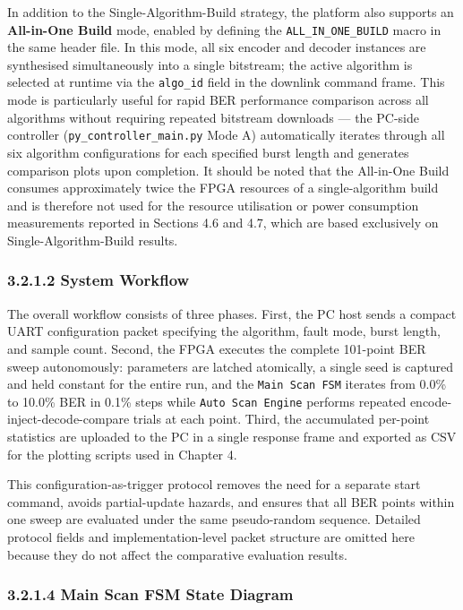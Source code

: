 \documentclass[
  12pt,
  a4paper]{report}
\begin{document}
In addition to the Single-Algorithm-Build strategy, the platform also
supports an \textbf{All-in-One Build} mode, enabled by defining the
\texttt{ALL\_IN\_ONE\_BUILD} macro in the same header file. In this
mode, all six encoder and decoder instances are synthesised
simultaneously into a single bitstream; the active algorithm is selected
at runtime via the \texttt{algo\_id} field in the downlink command
frame. This mode is particularly useful for rapid BER performance
comparison across all algorithms without requiring repeated bitstream
downloads --- the PC-side controller (\texttt{py\_controller\_main.py}
Mode A) automatically iterates through all six algorithm configurations
for each specified burst length and generates comparison plots upon
completion. It should be noted that the All-in-One Build consumes
approximately twice the FPGA resources of a single-algorithm build and
is therefore not used for the resource utilisation or power consumption
measurements reported in Sections 4.6 and 4.7, which are based
exclusively on Single-Algorithm-Build results.

\subsubsection{3.2.1.2 System Workflow}\label{system-workflow}

The overall workflow consists of three phases. First, the PC host sends
a compact UART configuration packet specifying the algorithm, fault
mode, burst length, and sample count. Second, the FPGA executes the
complete 101-point BER sweep autonomously: parameters are latched
atomically, a single seed is captured and held constant for the entire
run, and the \texttt{Main\ Scan\ FSM} iterates from 0.0\% to 10.0\% BER
in 0.1\% steps while \texttt{Auto\ Scan\ Engine} performs repeated
encode-inject-decode-compare trials at each point. Third, the
accumulated per-point statistics are uploaded to the PC in a single
response frame and exported as CSV for the plotting scripts used in
Chapter 4.

This configuration-as-trigger protocol removes the need for a separate
start command, avoids partial-update hazards, and ensures that all BER
points within one sweep are evaluated under the same pseudo-random
sequence. Detailed protocol fields and implementation-level packet
structure are omitted here because they do not affect the comparative
evaluation results.

\subsubsection{3.2.1.4 Main Scan FSM State
Diagram}\label{main-scan-fsm-state-diagram}
\end{document}
